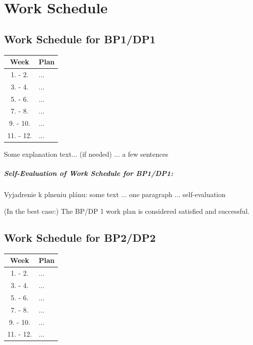 \thispagestyle{empty}

\chapter{Work Schedule}
\label{chapter:Work-Schedule}


\renewcommand*{\thepage}{B-\arabic{page}}



\section{Work Schedule for BP1/DP1}
\label{sec:Work-Schedule-1st-semester}

\begin{table}[ht]
    \centering
    \begin{tabular}{c|l}
    \toprule
        Week & Plan \\
    \midrule
        1. - 2.     & ... \\
        3. - 4.     & ... \\
        5. - 6.     & ... \\
        7. - 8.     & ... \\
        9. - 10.    & ... \\
        11. - 12.   & ... \\
    \bottomrule
    \end{tabular}
    \label{tab:dp1}
\end{table}


Some explanation text... (if needed) ... a few sentences

\paragraph{Self-Evaluation of Work Schedule for BP1/DP1:}
Vyjadrenie k plneniu plánu: some text ... one paragraph ... self-evaluation

(In the best case:) The BP/DP 1 work plan is considered satisfied and successful.



\newpage
\section{Work Schedule for BP2/DP2}
\label{sec:Work-Schedule-2nd-semester}

\begin{table}[ht]
    \centering
    \begin{tabular}{c|l}
    \toprule
        Week & Plan \\
    \midrule
        1. - 2.     & ... \\
        3. - 4.     & ... \\
        5. - 6.     & ... \\
        7. - 8.     & ... \\
        9. - 10.    & ... \\
        11. - 12.   & ... \\
    \bottomrule
    \end{tabular}
    \label{tab:dp2}
\end{table}

